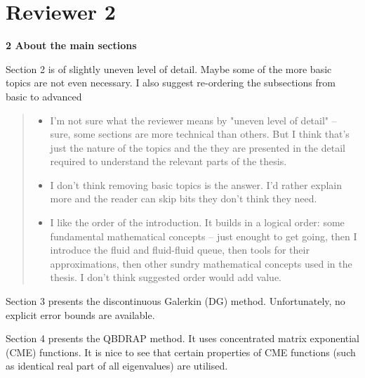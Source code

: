 \documentclass[a4paper]{article}
\begin{document}
\pagebreak
\section{Reviewer 2}

\textbf{2 About the main sections}

Section 2 is of slightly uneven level of detail. Maybe some of the more basic topics are not even necessary. I also suggest re-ordering the subsections from basic to advanced
\begin{quote}
    \begin{itemize}
        \item I'm not sure what the reviewer means by "uneven level of detail" -- sure, some sections are more technical than others. But I think that's just the nature of the topics and the they are presented in the detail required to understand the relevant parts of the thesis. 

        \item I don't think removing basic topics is the answer. I'd rather explain more and the reader can skip bits they don't think they need. 

        \item I like the order of the introduction. It builds in a logical order: some fundamental mathematical concepts -- just enought to get going, then I introduce the fluid and fluid-fluid queue, then tools for their approximations, then other sundry mathematical concepts used in the thesis. I don't think suggested order would add value.  
    \end{itemize}
\end{quote}

Section 3 presents the discontinuous Galerkin (DG) method. Unfortunately, no explicit error bounds are available.

Section 4 presents the QBDRAP method. It uses concentrated matrix exponential (CME) functions. It is nice to see that certain properties of CME functions (such as identical real part of all eigenvalues) are utilised. 
\end{document}
